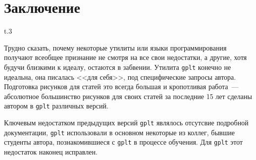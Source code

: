 \documentclass[12pt]{article}
\def\gplt{{\tt gplt}}
\begin{document}

\section{Заключение}
\begin{wrapfigure}[7]{t}{.3\textwidth}
  \vphantom{.}
  \vspace{-2.3cm}

\end{wrapfigure}

Трудно сказать, почему некоторые утилиты или языки программирования  получают всеобщее признание не смотря на все свои недостатки,
а другие, хотя будучи близкими к идеалу, остаются в забвении. 
Утилита \gplt{} конечно не идеальна, она писалась <<для себя>>, под специфические запросы автора.
Подготовка рисунков для статей это всегда большая и кропотливая работа~---
абсолютное большинство рисунков для своих статей за последние 15 лет сделаны автором в \verb'gplt' различных версий.

Ключевым недостатком предыдущих версий \verb'gplt' являлось отсутсвие подробной документации,
\verb'gplt' использовали в основном некоторые из коллег, бывшие студенты автора, познакомившиеся с \verb'gplt'
в процессе обучения. Для \gplt{}  этот недостаток наконец исправлен. 



\end{document}
